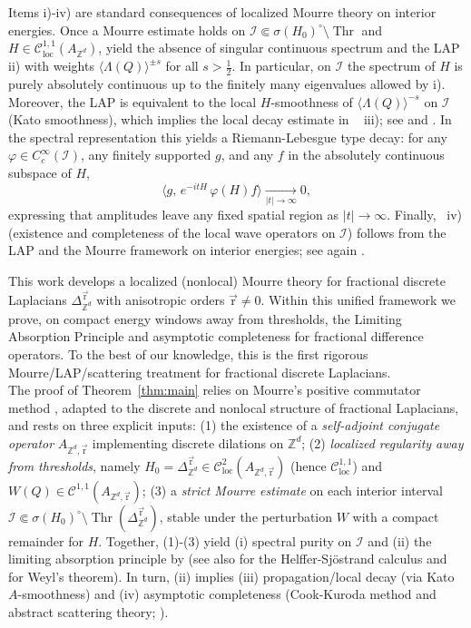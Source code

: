 \documentclass[10pt]{amsart} %
\newcommand{\Z}{{\mathbb{Z}}}
\newcommand{\1}{{\mathbb{I}}}
\newcommand{\Ic}{\mathcal{I}}
\newcommand{\Thr}{\operatorname{Thr}}
\numberwithin{equation}{section}
\begin{document}
Items i)-iv) are standard consequences of localized Mourre theory on interior energies.
Once a Mourre estimate holds on $\Ic\Subset\sigma(H_0)^\circ\setminus\Thr$ and $H\in\mathcal{C}^{1,1}_{\mathrm{loc}}(A_{\Z^d})$,
\cite[Thms.~7.4.1-7.4.2]{ABG} yield the absence of singular continuous spectrum and the LAP ii)
with weights $\langle\Lambda(Q)\rangle^{\pm s}$ for all $s>\tfrac12$. In particular, on $\Ic$ the spectrum of $H$ is purely absolutely
continuous up to the finitely many eigenvalues allowed by i). Moreover, the LAP is equivalent to the local $H$-smoothness
of $\langle\Lambda(Q)\rangle^{-s}$ on $\Ic$ (Kato smoothness), which implies the local decay estimate in ~ iii); see
\cite[Ch.~7]{ABG} and \cite[Section VIII.C]{RS}. In the spectral representation this yields a Riemann-Lebesgue type decay:
for any $\varphi\in C_c^\infty(\Ic)$, any finitely supported $g$, and any $f$ in the absolutely continuous subspace of $H$,
\[
\langle g,\,e^{-itH}\,\varphi(H)f\rangle \xrightarrow[|t|\to\infty]{} 0,
\]
expressing that amplitudes leave any fixed spatial region as $|t|\to\infty$. Finally, ~iv)
(existence and completeness of the local wave operators on $\Ic$) follows from the LAP and the Mourre framework on interior energies; see again \cite[Ch.~7]{ABG}.

This work develops a localized (nonlocal) Mourre theory for fractional discrete Laplacians
$\Delta^{\vec{\mathrm{r}}}_{\Z^d}$ with anisotropic orders $\vec{\mathrm{r}}\neq0$.
Within this unified framework we prove, on compact energy windows
away from thresholds, the Limiting Absorption Principle and asymptotic completeness for fractional
difference operators. To the best of our knowledge, this is the first rigorous Mourre/LAP/scattering
treatment for fractional discrete Laplacians.\\
\noindent
The proof of Theorem~\ref{thm:main} relies on Mourre's positive commutator method \cite{Mo83,Ge2015,GGM1,GeGe,PR}, adapted to the discrete and nonlocal structure of fractional Laplacians, and rests on three explicit inputs:
(1) the existence of a \emph{self-adjoint conjugate operator} $A_{\Z^d,\vec{\mathrm r}}$ implementing discrete dilations on $\Z^d$;
(2) \emph{localized regularity away from thresholds}, namely $H_0=\Delta_{\Z^d}^{\vec{\mathrm r}}\in\mathcal{C}^2_{\mathrm{loc}}(A_{\Z^d,\vec{\mathrm r}})$ (hence $\mathcal{C}^{1,1}_{\mathrm{loc}}$) and $W(Q)\in\mathcal{C}^{1,1}(A_{\Z^d,\vec{\mathrm r}})$;
(3) a \emph{strict Mourre estimate} on each interior interval $\Ic\Subset\sigma(H_0)^\circ\setminus\Thr(\Delta_{\Z^d}^{\vec{\mathrm r}})$, stable under the perturbation $W$ with a compact remainder for $H$.
Together, (1)-(3) yield (i) spectral purity on $\Ic$ and (ii) the limiting absorption principle by \cite[Ch.~7, Thms.~7.4.1-7.4.2]{ABG} (see also \cite[App.~A]{ABG} for the Helffer-Sj{\"o}strand calculus and \cite[Thm.~VI.16]{RS} for Weyl's theorem).
In turn, (ii) implies (iii) propagation/local decay (via Kato $A$-smoothness) and (iv) asymptotic completeness (Cook-Kuroda method and abstract scattering theory; \cite[Ch.~7]{ABG}).
\end{document}
